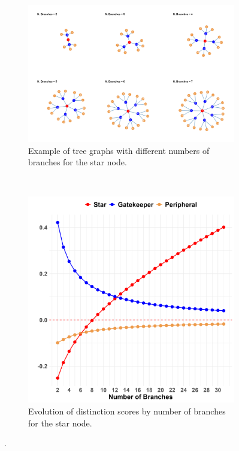 \documentclass[12pt]{article}
\begin{document}
\begin{figure}
    \captionsetup[subfigure]{font=footnotesize,labelfont=footnotesize}
    \centering
    \begin{subfigure}[b]{0.9\textwidth}
        \includegraphics[width=1.0\textwidth]{Plots/tree-examples.png}
            \caption{Example of tree graphs with different numbers of branches for the star node.}
            \label{fig:tree-examples}
    \end{subfigure} \\
    \begin{subfigure}[b]{0.55\textwidth}
        \includegraphics[width=1.0\textwidth]{Plots/broker-tree-roles-by-nbranches.png}
            \caption{Evolution of distinction scores by number of branches for the star node.}
            \label{fig:broker-tree-roles}
    \end{subfigure}
    \caption{.}
    \label{fig:toys}
\end{figure}
\end{document}
